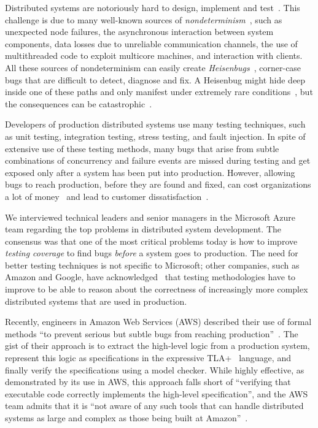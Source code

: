 Distributed systems are notoriously hard to design, implement and test~\cite{cavage2013there, leesatapornwongsa2014samc, laguna2015debugging, maddox2015test}. This challenge is due to many well-known sources of \emph{nondeterminism}~\cite{chandra2007paxos, henry2009cloud}, such as unexpected node failures, the asynchronous interaction between system components, data losses due to unreliable communication channels, the use of multithreaded code to exploit multicore machines, and interaction with clients. All these sources of nondeterminism can easily create \emph{Heisenbugs}~\cite{gray1986computers, musuvathi2008finding}, corner-case bugs that are difficult to detect, diagnose and fix. A Heisenbug might hide deep inside one of these paths and only manifest under extremely rare conditions~\cite{gray1986computers, musuvathi2008finding}, but the consequences can be catastrophic~\cite{amazon2012aws, google2014outage}.

Developers of production distributed systems use many testing techniques, such as unit testing, integration testing, stress testing, and fault injection. In spite of extensive use of these testing methods, many bugs that arise from subtle combinations of concurrency and failure events are missed during testing and get exposed only after a system has been put into production. However, allowing bugs to reach production, before they are found and fixed, can cost organizations a lot of money~\cite{tassey2002economic} and lead to customer dissatisfaction~\cite{amazon2012aws, google2014outage}.

We interviewed technical leaders and senior managers in the Microsoft Azure team regarding the top problems in distributed system development. The consensus was that one of the most critical problems today is how to improve \emph{testing coverage} to find bugs \emph{before} a system goes to production. The need for better testing techniques is not specific to Microsoft; other companies, such as Amazon and Google, have acknowledged~\cite{chandra2007paxos,newcombe2015aws} that testing methodologies have to improve to be able to reason about the correctness of increasingly more complex distributed systems that are used in production.

Recently, engineers in Amazon Web Services (AWS) described their use of formal methods ``to prevent serious but subtle bugs from reaching production''~\cite{newcombe2015aws}. The gist of their approach is to extract the high-level logic from a production system, represent this logic as specifications in the expressive TLA+~\cite{lamport1994temporal} language, and finally verify the specifications using a model checker. While highly effective, as demonstrated by its use in AWS, this approach falls short of ``verifying that executable code correctly implements the high-level specification'', and the AWS team admits that it is ``not aware of any such tools that can handle distributed systems as large and complex as those being built at Amazon''~\cite{newcombe2015aws}.

